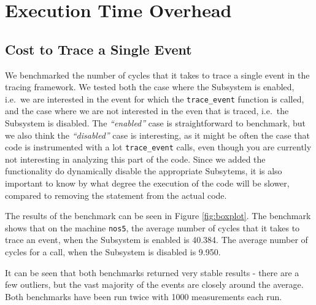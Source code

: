 \documentclass[a4paper,11pt,twoside]{report}
\begin{document}
\section{Execution Time Overhead}

\subsection{Cost to Trace a Single Event}

We benchmarked the number of cycles that it takes to trace a single event in the
tracing framework. We tested both the case where the Subsystem is enabled,
i.e.~we are interested in the event for which the \texttt{trace\_event} function
is called, and the case where we are not interested in the even that is traced,
i.e.~the Subsystem is disabled. The \emph{``enabled''} case is straightforward
to benchmark, but we also think the \emph{``disabled''} case is interesting, as
it might be often the case that code is instrumented with a lot
\texttt{trace\_event} calls, even though you are currently not interesting in
analyzing this part of the code. Since we added the functionality do dynamically
disable the appropriate Subsytems, it is also important to know by what degree
the execution of the code will be slower, compared to removing the statement
from the actual code.

The results of the benchmark can be seen in Figure \ref{fig:boxplot}. The
benchmark shows that on the machine \texttt{nos5}, the average number of cycles
that it takes to trace an event, when the Subsystem is enabled is 40.384. The
average number of cycles for a call, when the Subsystem is disabled is 9.950.

It can be seen that both benchmarks returned very stable results - there are a
few outliers, but the vast majority of the events are closely around the
average. Both benchmarks have been run twice with 1000 measurements each run.
\end{document}
